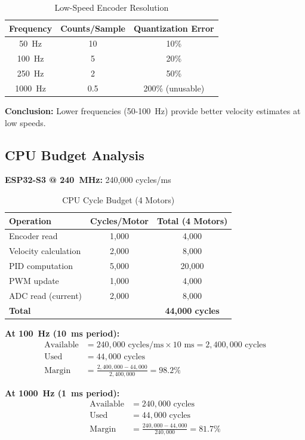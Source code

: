 \documentclass[12pt,letterpaper]{article}
\begin{document}
\begin{table}[H]
\centering
\caption{Low-Speed Encoder Resolution}
\begin{tabular}{ccc}
\toprule
\textbf{Frequency} & \textbf{Counts/Sample} & \textbf{Quantization Error} \\
\midrule
50~Hz & 10 & 10\% \\
100~Hz & 5 & 20\% \\
250~Hz & 2 & 50\% \\
1000~Hz & 0.5 & 200\% (unusable) \\
\bottomrule
\end{tabular}
\end{table}

\textbf{Conclusion:} Lower frequencies (50-100~Hz) provide better velocity estimates at low speeds.

\subsection{CPU Budget Analysis}

\textbf{ESP32-S3 @ 240~MHz:} 240,000 cycles/ms

\begin{table}[H]
\centering
\caption{CPU Cycle Budget (4 Motors)}
\begin{tabular}{lcc}
\toprule
\textbf{Operation} & \textbf{Cycles/Motor} & \textbf{Total (4 Motors)} \\
\midrule
Encoder read & 1,000 & 4,000 \\
Velocity calculation & 2,000 & 8,000 \\
PID computation & 5,000 & 20,000 \\
PWM update & 1,000 & 4,000 \\
ADC read (current) & 2,000 & 8,000 \\
\midrule
\textbf{Total} & & \textbf{44,000 cycles} \\
\bottomrule
\end{tabular}
\end{table}

\textbf{At 100~Hz (10~ms period):}
\begin{align}
\text{Available} &= 240,000 \text{ cycles/ms} \times 10 \text{ ms} = 2,400,000 \text{ cycles} \\
\text{Used} &= 44,000 \text{ cycles} \\
\text{Margin} &= \frac{2,400,000 - 44,000}{2,400,000} = 98.2\%
\end{align}

\textbf{At 1000~Hz (1~ms period):}
\begin{align}
\text{Available} &= 240,000 \text{ cycles} \\
\text{Used} &= 44,000 \text{ cycles} \\
\text{Margin} &= \frac{240,000 - 44,000}{240,000} = 81.7\%
\end{align}
\end{document}
